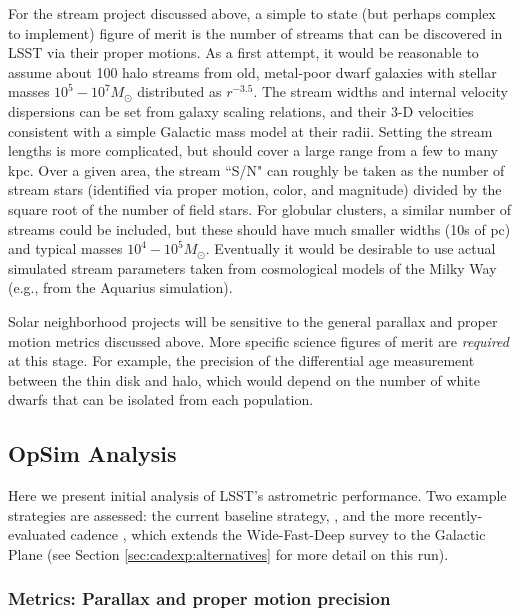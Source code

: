 For the stream project discussed above, a simple to state (but perhaps complex to implement) figure of merit
is the number of streams that can be discovered in LSST via their proper motions. As a first
attempt, it would be reasonable to assume about 100 halo streams from old, metal-poor dwarf galaxies with
stellar masses $10^5-10^7 M_{\odot}$ distributed as $r^{-3.5}$. The stream widths and internal velocity
dispersions can be set from galaxy scaling relations, and their 3-D velocities consistent with a simple Galactic mass
model at their radii. Setting the stream lengths is more complicated, but should cover a large range from a few to many kpc.
Over a given area, the stream ``S/N" can roughly be taken as the number of stream stars (identified via proper motion, color, and magnitude)
divided by the square root of the number of field stars. For globular clusters, a similar number of streams could be included, but these should have much smaller widths (10s of pc)
and typical masses $10^4-10^5 M_{\odot}$. Eventually it would be desirable to use actual simulated stream parameters taken from cosmological models of the Milky Way (e.g.,
from the Aquarius simulation).

Solar neighborhood projects will be sensitive to the general parallax and proper motion metrics discussed above. More specific science figures of merit are {\it required} at this stage.  For example, the precision of the differential age measurement between the thin disk and halo, which would depend on the number of white dwarfs that can be isolated
from each population.

\subsection{OpSim Analysis}
\label{sec:\secname:MW_Astrometry_OpSim}

Here we present initial analysis of LSST's astrometric
performance. Two example strategies are assessed: the current baseline
strategy, , and the more recently-evaluated cadence
, which extends the Wide-Fast-Deep
survey to the Galactic Plane (see Section \autoref{sec:cadexp:alternatives}
for more detail on this run).


\subsubsection{Metrics: Parallax and proper motion precision}

